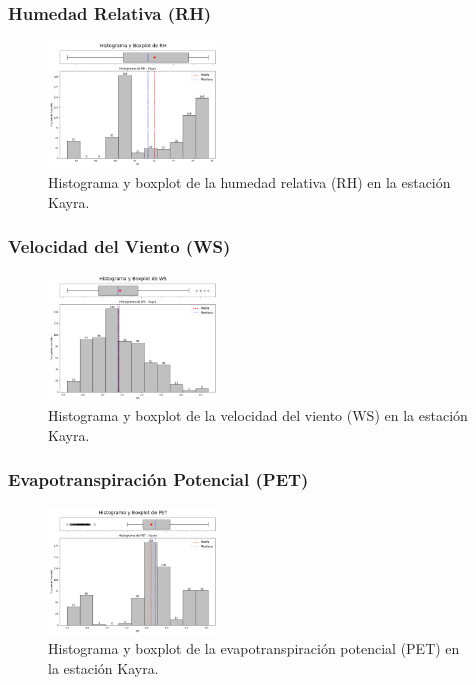 \subsubsection*{Humedad Relativa (RH)}
\begin{figure}[H]
\centering
\includegraphics[width=0.4\textwidth]{resultados/por_estacion_meteorologica/Kayra/RH_histograma.png}
\caption{Histograma y boxplot de la humedad relativa (RH) en la estación Kayra.}
\label{fig:kayra_RH}
\end{figure}

\subsubsection*{Velocidad del Viento (WS)}
\begin{figure}[H]
\centering
\includegraphics[width=0.4\textwidth]{resultados/por_estacion_meteorologica/Kayra/WS_histograma.png}
\caption{Histograma y boxplot de la velocidad del viento (WS) en la estación Kayra.}
\label{fig:kayra_WS}
\end{figure}

\subsubsection*{Evapotranspiración Potencial (PET)}
\begin{figure}[H]
\centering
\includegraphics[width=0.4\textwidth]{resultados/por_estacion_meteorologica/Kayra/PET_histograma.png}
\caption{Histograma y boxplot de la evapotranspiración potencial (PET) en la estación Kayra.}
\label{fig:kayra_PET}
\end{figure}

